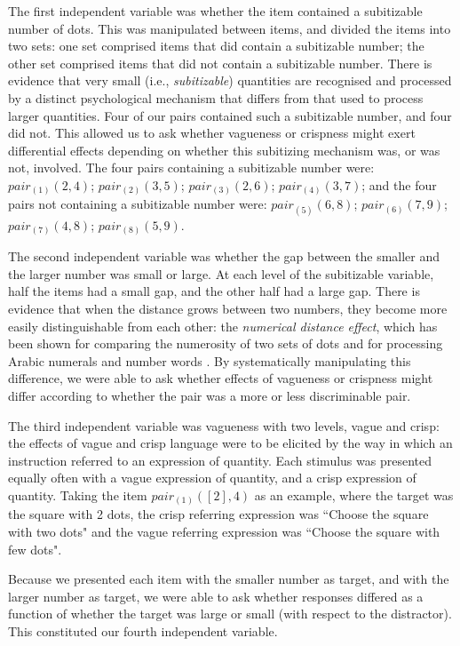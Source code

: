 \documentclass[man,floatmark]{apa}
\begin{document}
The first independent variable was whether the item contained a subitizable number of dots. This was manipulated between items, and divided the items into two sets: one set comprised items that did contain a subitizable number; the other set comprised items that did not contain a subitizable number. There is evidence \cite{trick1994small} that very small (i.e., \emph{subitizable}) quantities are recognised and processed by a distinct psychological mechanism that differs from that used to process larger quantities. Four of our pairs contained such a subitizable number, and four did not. This allowed us to ask whether vagueness or crispness might exert differential effects depending on whether this subitizing mechanism was, or was not, involved. The four pairs containing a subitizable number were: $pair_{(1)}(2,4)$; $pair_{(2)}(3,5)$; $pair_{(3)}(2,6)$; $pair_{(4)}(3,7)$; and the four pairs not containing a subitizable number were: $pair_{(5)}(6,8)$; $pair_{(6)}(7,9)$; $pair_{(7)}(4,8)$; $pair_{(8)}(5,9)$.

The second independent variable was whether the gap between the smaller and the larger number was small or large. At each level of the subitizable variable, half the items had a small gap, and the other half had a large gap. There is evidence that when the distance grows between two numbers, they become more easily distinguishable from each other: the \emph{numerical distance effect}, which has been shown for comparing the numerosity of two sets of dots \cite{van123} and for processing Arabic numerals and number words \cite{Dehaene199647}. By systematically manipulating this difference, we were able to ask whether effects of vagueness or crispness might differ according to whether the pair was a more or less discriminable pair. 

The third independent variable was vagueness with two levels, vague and crisp: the effects of vague and crisp language were to be elicited by the way in which an instruction referred to an expression of quantity. Each stimulus was presented equally often with a  vague expression of quantity, and a crisp expression of quantity. Taking the item $pair_{(1)}([2],4)$ as an example, where the target was the square with 2 dots, the crisp referring expression was ``Choose the square with two dots" and the vague referring expression was ``Choose the square with few dots".

Because we presented each item with the smaller number as target, and with the larger number as target, we were able to ask whether responses differed as a function of whether the target was large or small (with respect to the distractor). This constituted our fourth independent variable.
\end{document}
